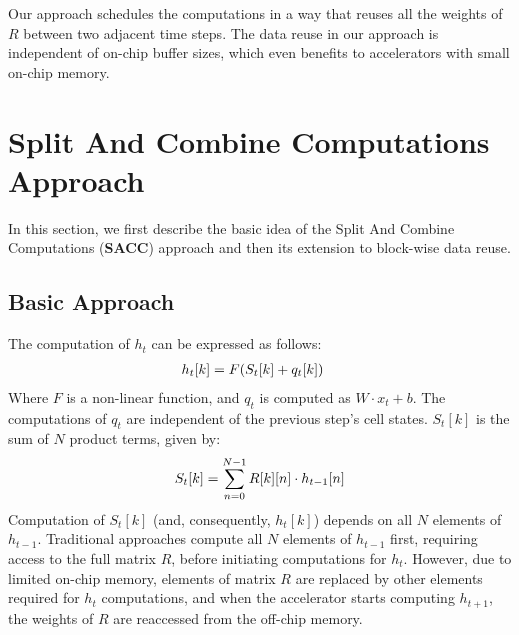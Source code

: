 Our approach schedules the computations in a way that reuses all the weights of $R$ between two adjacent time steps. The data reuse in our approach is independent of on-chip buffer sizes, which even benefits to accelerators with small on-chip memory. 

\section{Split And Combine Computations Approach}
In this section, we first describe the basic idea of the Split And Combine Computations (\textbf{SACC}) approach and then its extension to block-wise data reuse.
\subsection{Basic Approach}\label{sec:elementWiseApproach}
The computation of $h_t$ can be expressed as follows:
\begin{align}\label{eq:h_{t}}
	h_{t}[k] &= F( S_{t}[k]+q_{t}[k])
\end{align}
Where $F$ is a non-linear function, and $q_{t}$ is computed as $W{\cdot}x_t{+}b$. The computations of $q_{t}$ are independent of the previous step's cell states. $S_{t}[k]$ is the sum of $N$ product terms, given by:
\begin{align}\label{eq:S_{t}}
	S_{t}[k] = \sum_{n=0}^{N-1}R[k][n]\cdot h_{t-1}[n]
\end{align}
Computation of $S_{t}[k]$ (and, consequently, $h_{t}[k]$) depends on all $N$ elements of $h_{t-1}$. Traditional approaches compute all $N$ elements of $h_{t-1}$ first, requiring access to the full matrix $R$, before initiating computations for $h_{t}$. However, due to limited on-chip memory, elements of matrix $R$ are replaced by other elements required for $h_{t}$ computations, and when the accelerator starts computing $h_{t+1}$, the weights of $R$ are reaccessed from the off-chip memory.

